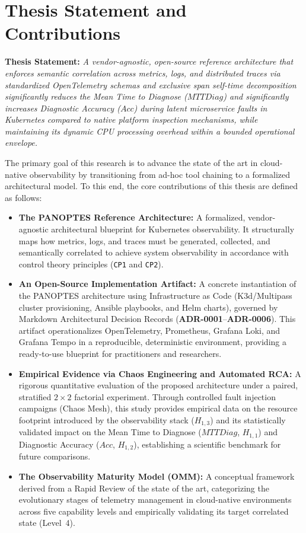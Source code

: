 \section{Thesis Statement and Contributions}
\label{sec:statement}

\textbf{Thesis Statement:} \textit{A vendor-agnostic, open-source reference architecture that enforces semantic correlation across metrics, logs, and distributed traces via standardized OpenTelemetry schemas and exclusive span self-time decomposition significantly reduces the Mean Time to Diagnose ($MTTDiag$) and significantly increases Diagnostic Accuracy ($Acc$) during latent microservice faults in Kubernetes compared to native platform inspection mechanisms, while maintaining its dynamic CPU processing overhead within a bounded operational envelope.}

The primary goal of this research is to advance the state of the art in cloud-native observability by transitioning from ad-hoc tool chaining to a formalized architectural model. To this end, the core contributions of this thesis are defined as follows:

\begin{itemize}
    \item \textbf{The PANOPTES Reference Architecture:} A formalized, vendor-agnostic architectural blueprint for Kubernetes observability. It structurally maps how metrics, logs, and traces must be generated, collected, and semantically correlated to achieve system observability in accordance with control theory principles (\texttt{CP1} and \texttt{CP2}).
    
    \item \textbf{An Open-Source Implementation Artifact:} A concrete instantiation of the PANOPTES architecture using Infrastructure as Code (K3d/Multipass cluster provisioning, Ansible playbooks, and Helm charts), governed by Markdown Architectural Decision Records (\textbf{ADR-0001}--\textbf{ADR-0006}). This artifact operationalizes OpenTelemetry, Prometheus, Grafana Loki, and Grafana Tempo in a reproducible, deterministic environment, providing a ready-to-use blueprint for practitioners and researchers.
    
    \item \textbf{Empirical Evidence via Chaos Engineering and Automated RCA:} A rigorous quantitative evaluation of the proposed architecture under a paired, stratified $2\times2$ factorial experiment. Through controlled fault injection campaigns (Chaos Mesh), this study provides empirical data on the resource footprint introduced by the observability stack ($H_{1,3}$) and its statistically validated impact on the Mean Time to Diagnose ($MTTDiag$, $H_{1,1}$) and Diagnostic Accuracy ($Acc$, $H_{1,2}$), establishing a scientific benchmark for future comparisons.

    \item \textbf{The Observability Maturity Model (OMM):} A conceptual framework derived from a Rapid Review of the state of the art, categorizing the evolutionary stages of telemetry management in cloud-native environments across five capability levels and empirically validating its target correlated state (Level~4).
\end{itemize}
